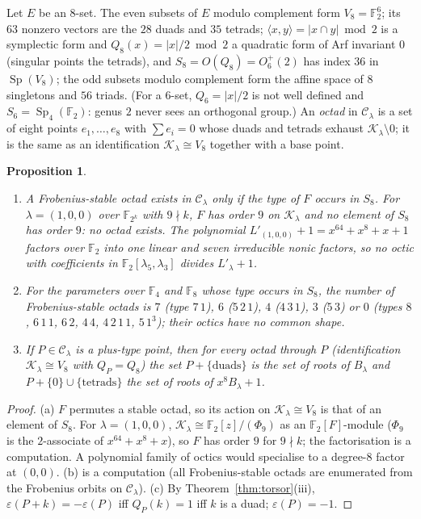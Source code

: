 \documentclass[12pt,a4paper]{amsart}
\newtheorem{proposition}[theorem]{Proposition}
\theoremstyle{definition}
\newcommand{\F}{\mathbb{F}}
\newcommand{\Sp}{\operatorname{Sp}}
\newcommand{\eps}{\varepsilon}
\newcommand{\Kk}{\mathcal{K}}
\newcommand{\Cc}{\mathcal{C}}
\begin{document}
Let $E$ be an $8$-set. The even subsets of $E$ modulo complement form $V_8=\F_2^6$; its $63$ nonzero vectors are the $28$ duads and $35$ tetrads; $\langle x,y\rangle=|x\cap y|\bmod2$ is a symplectic form and $Q_8(x)=|x|/2\bmod 2$ a quadratic form of Arf invariant $0$ (singular points the tetrads), and $S_8=O(Q_8)=O_6^+(2)$ has index $36$ in $\Sp(V_8)$; the odd subsets modulo complement form the affine space of $8$ singletons and $56$ triads. (For a $6$-set, $Q_6=|x|/2$ is not well defined and $S_6=\Sp_4(\F_2)$: genus $2$ never sees an orthogonal group.) An \emph{octad} in $\Cc_\lambda$ is a set of eight points $e_1,\dots,e_8$ with $\sum e_i=0$ whose duads and tetrads exhaust $\Kk_\lambda\setminus0$; it is the same as an identification $\Kk_\lambda\cong V_8$ together with a base point.

\begin{proposition}\label{prop:octad}
\begin{enumerate}[label=\textup{(\alph*)},leftmargin=2em]
\item A Frobenius-stable octad exists in $\Cc_\lambda$ only if the type of $F$ occurs in $S_8$. For $\lambda=(1,0,0)$ over $\F_{2^k}$ with $9\nmid k$, $F$ has order $9$ on $\Kk_\lambda$ and no element of $S_8$ has order $9$: no octad exists. The polynomial $L'_{(1,0,0)}+1=x^{64}+x^8+x+1$ factors over $\F_2$ into one linear and seven irreducible nonic factors, so no octic with coefficients in $\F_2[\lambda_5,\lambda_3]$ divides $L'_\lambda+1$.
\item For the parameters over $\F_4$ and $\F_8$ whose type occurs in $S_8$, the number of Frobenius-stable octads is $7$ (type $7\,1$), $6$ ($5\,2\,1$), $4$ ($4\,3\,1$), $3$ ($5\,3$) or $0$ (types $8$, $6\,1\,1$, $6\,2$, $4\,4$, $4\,2\,1\,1$, $5\,1^3$); their octics have no common shape.
\item If $P\in\Cc_\lambda$ is a plus-type point, then for every octad through $P$ \textup{(}identification $\Kk_\lambda\cong V_8$ with $Q_P=Q_8$\textup{)} the set $P+\{\text{duads}\}$ is the set of roots of $B_\lambda$ and $P+\{0\}\cup\{\text{tetrads}\}$ the set of roots of $x^8B_\lambda+1$.
\end{enumerate}
\end{proposition}
\begin{proof}
(a) $F$ permutes a stable octad, so its action on $\Kk_\lambda\cong V_8$ is that of an element of $S_8$. For $\lambda=(1,0,0)$, $\Kk_\lambda\cong\F_2[z]/(\Phi_9)$ as an $\F_2[F]$-module ($\Phi_9$ is the $2$-associate of $x^{64}+x^8+x$), so $F$ has order $9$ for $9\nmid k$; the factorisation is a computation. A polynomial family of octics would specialise to a degree-$8$ factor at $(0,0)$. (b) is a computation (all Frobenius-stable octads are enumerated from the Frobenius orbits on $\Cc_\lambda$). (c) By Theorem~\ref{thm:torsor}(iii), $\eps(P+k)=-\eps(P)$ iff $Q_P(k)=1$ iff $k$ is a duad; $\eps(P)=-1$.
\end{proof}
\end{document}
